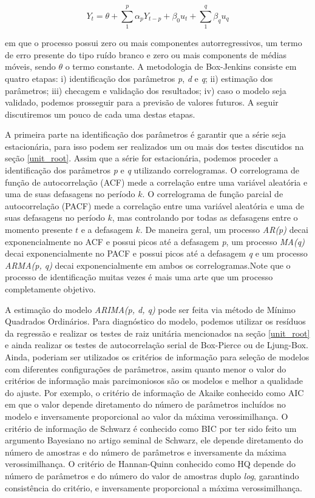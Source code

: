 \documentclass[twocolumn]{rbef}
\newcommand{\1}{\mathbbm{1}}
\begin{document}
\begin{equation}
    Y_{t} = \theta + \sum_{1}^{p} \alpha_{p} Y_{t-p} + \beta_{0} u_{t} + \sum_{1}^{q} \beta_{q} u_{q}
\end{equation}

em que o processo possui zero ou mais componentes autorregressivos, um termo de erro presente do tipo ruído branco e zero ou mais components de médias móveis, sendo $\theta$ o termo constante. A metodologia de Box-Jenkins\cite{Box-Jenkins} consiste em quatro etapas: i) identificação dos parâmetros \textit{p}, \textit{d} e \textit{q}; ii) estimação dos parâmetros; iii) checagem e validação dos resultados; iv) caso o modelo seja validado, podemos prosseguir para a previsão de valores futuros. A seguir discutiremos um pouco de cada uma destas etapas.

A primeira parte na identificação dos parâmetros é garantir que a série seja estacionária, para isso podem ser realizados um ou mais dos testes discutidos na seção \ref{unit_root}. Assim que a série for estacionária, podemos proceder a identificação dos parâmetros \textit{p} e \textit{q} utilizando correlogramas. O correlograma de função de autocorrelação (ACF) mede a correlação entre uma variável aleatória e uma de suas defasagens no período $k$. O correlograma de função parcial de autocorrelação (PACF) mede a correlação entre uma variável aleatória e uma de suas defasagens no período $k$, mas controlando por todas as defasagens entre o momento presente $t$ e a defasagem $k$. De maneira geral, um processo \textit{AR(p)} decai exponencialmente no ACF e possui picos até a defasagem \textit{p}, um processo \textit{MA(q)} decai exponencialmente no PACF e possui picos até a defasagem \textit{q} e um processo \textit{ARMA(p, q)} decai exponencialmente em ambos os correlogramas.Note que o processo de identificação muitas vezes é mais uma arte que um processo completamente objetivo\cite{Enders}.

A estimação do modelo \textit{ARIMA(p, d, q)} pode ser feita via método de Mínimo Quadrados Ordinários. Para diagnóstico do modelo, podemos utilizar os resíduos da regressão e realizar os testes de raiz unitária mencionados na seção \ref{unit_root} e ainda realizar os testes de autocorrelação serial de Box-Pierce\cite{Box-Pierce} ou de Ljung-Box\cite{Ljung-Box}. Ainda, poderiam ser utilizados os critérios de informação para seleção de modelos com diferentes configurações de parâmetros, assim quanto menor o valor do critérios de informação mais parcimoniosos são os modelos e melhor a qualidade do ajuste. Por exemplo, o critério de informação de Akaike\cite{Akaike} conhecido como AIC em que o valor depende diretamento do número de parâmetros incluídos no modelo e inversamente proporcional ao valor da máxima verossimilhança. O critério de informação de Schwarz\cite{Schwarz} é conhecido como BIC por ter sido feito um argumento Bayesiano no artigo seminal de Schwarz, ele depende diretamento do número de amostras e do número de parâmetros e inversamente da máxima verossimilhança. O critério de Hannan-Quinn\cite{Hannan} conhecido como HQ depende do número de parâmetros e do número do valor de amostras duplo \textit{log}, garantindo consistência do critério, e inversamente proporcional a máxima verossimilhança.
\end{document}
